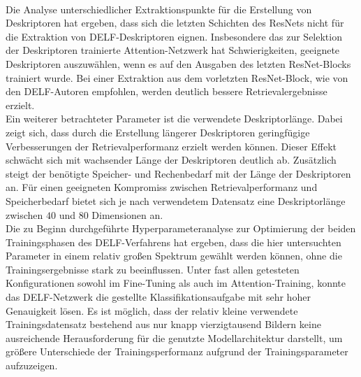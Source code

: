 \\
Die Analyse unterschiedlicher Extraktionspunkte für die Erstellung von Deskriptoren hat ergeben, dass sich die letzten Schichten des ResNets nicht für die Extraktion von DELF-Deskriptoren eignen. Insbesondere das zur Selektion der Deskriptoren trainierte Attention-Netzwerk hat Schwierigkeiten, geeignete Deskriptoren auszuwählen, wenn es auf den Ausgaben des letzten ResNet-Blocks trainiert wurde. Bei einer Extraktion aus dem vorletzten ResNet-Block, wie von den DELF-Autoren empfohlen, werden deutlich bessere Retrievalergebnisse erzielt.
\\
Ein weiterer betrachteter Parameter ist die verwendete Deskriptorlänge. Dabei zeigt sich, dass durch die Erstellung längerer Deskriptoren geringfügige Verbesserungen der Retrievalperformanz erzielt werden können. Dieser Effekt schwächt sich mit wachsender Länge der Deskriptoren deutlich ab. Zusätzlich steigt der benötigte Speicher- und Rechenbedarf mit der Länge der Deskriptoren an. Für einen geeigneten Kompromiss zwischen Retrievalperformanz und Speicherbedarf bietet sich je nach verwendetem Datensatz eine Deskriptorlänge zwischen $40$ und $80$ Dimensionen an.
\\
Die zu Beginn durchgeführte Hyperparameteranalyse zur Optimierung der beiden Trainingsphasen des DELF-Verfahrens hat ergeben, dass die hier untersuchten Parameter in einem relativ großen Spektrum gewählt werden können, ohne die Trainingsergebnisse stark zu beeinflussen. Unter fast allen getesteten Konfigurationen sowohl im Fine-Tuning als auch im Attention-Training, konnte das DELF-Netzwerk die gestellte Klassifikationsaufgabe mit sehr hoher Genauigkeit lösen. Es ist möglich, dass der relativ kleine verwendete Trainingsdatensatz bestehend aus nur knapp vierzigtausend Bildern keine ausreichende Herausforderung für die genutzte Modellarchitektur darstellt, um größere Unterschiede der Trainingsperformanz aufgrund der Trainingsparameter aufzuzeigen.

